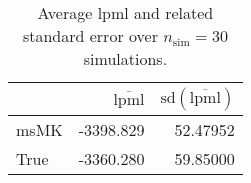 \begin{table}[H]

\caption{Average lpml and related standard error over $n_{\text{sim}} = 30$ simulations.}
\centering
\begin{tabular}[t]{lrr}
\toprule
  & $\overbar{\text{lpml}}$ & $\text{sd}(\overbar{\text{lpml}})$\\
\midrule
msMK & -3398.829 & 52.47952\\
True & -3360.280 & 59.85000\\
\bottomrule
\end{tabular}
\end{table}
